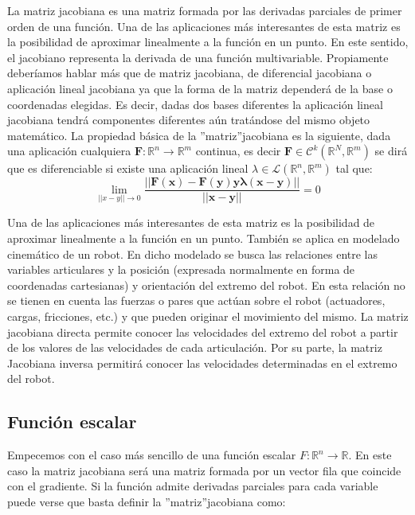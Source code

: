 La matriz jacobiana es una matriz formada por las derivadas parciales de primer orden de una función. Una de las aplicaciones más interesantes de esta matriz es la posibilidad de aproximar linealmente a la función en un punto. En este sentido, el jacobiano representa la derivada de una función multivariable. Propiamente  deberíamos  hablar  más  que  de  matriz  jacobiana,  de  diferencial  jacobiana  o  aplicación lineal  jacobiana  ya  que  la  forma  de  la  matriz  dependerá de  la  base  o  coordenadas  elegidas.  Es  decir, dadas  dos  bases  diferentes  la  aplicación  lineal  jacobiana  tendrá  componentes  diferentes  aún  tratándose del  mismo  objeto  matemático.  La  propiedad  básica  de  la  ”matriz”jacobiana  es  la  siguiente,  dada  una aplicación  cualquiera $\mathbf{F} \colon \mathbb{R}^n \rightarrow \mathbb{R}^m$ continua, es decir $\mathbf{F} \in \mathcal{C}^k(\mathbb{R}^N,\mathbb{R}^m)$ se dirá que es diferenciable si existe una aplicación lineal $\lambda \in \mathcal{L}(\mathbb{R}^n,\mathbb{R}^m)$ tal que:
\begin{equation}
\lim\limits_{||x-y|| \to 0}\frac{||\mathbf{F(x) - F(y) y \lambda(x-y)||}}{\mathbf{||x-y||}}=0
\end{equation}

Una  de  las  aplicaciones  más  interesantes  de  esta  matriz  es  la  posibilidad  de  aproximar  linealmente a  la  función  en  un  punto.  También  se  aplica  en  modelado  cinemático  de  un  robot.  En  dicho  modelado se busca las relaciones entre las variables articulares y la posición (expresada normalmente en forma de coordenadas  cartesianas)  y  orientación  del  extremo  del  robot.  En  esta  relación  no  se  tienen  en  cuenta las fuerzas o pares que actúan sobre el robot (actuadores, cargas, fricciones, etc.) y que pueden originar el movimiento del mismo. La matriz jacobiana directa permite conocer las velocidades del extremo del robot  a  partir  de  los  valores  de  las  velocidades  de  cada  articulación.  Por  su  parte,  la  matriz  Jacobiana inversa permitirá conocer las velocidades determinadas en el extremo del robot.

\subsection{Función escalar}

Empecemos con el caso más sencillo de una función escalar $F \colon \mathbb{R}^n \rightarrow \mathbb{R}$. En  este  caso  la  matriz jacobiana será una matriz formada por un vector fila que coincide con el gradiente. Si la función admite derivadas parciales para cada variable puede verse que basta definir la ”matriz”jacobiana como:


